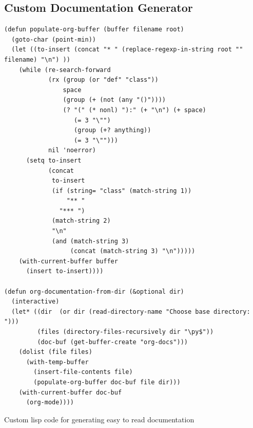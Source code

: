 \documentclass[11pt]{report}
\begin{document}
\subsection{Custom Documentation Generator}
\label{sec-7-3-2}
\begin{listing}[H]
\begin{verbatim}
(defun populate-org-buffer (buffer filename root)
  (goto-char (point-min))
  (let ((to-insert (concat "* " (replace-regexp-in-string root "" filename) "\n") ))
    (while (re-search-forward
            (rx (group (or "def" "class"))
                space
                (group (+ (not (any "()"))))
                (? "(" (* nonl) "):" (+ "\n") (+ space)
                   (= 3 "\"")
                   (group (+? anything))
                   (= 3 "\"")))
            nil 'noerror)
      (setq to-insert
            (concat
             to-insert
             (if (string= "class" (match-string 1))
                 "** "
               "*** ")
             (match-string 2)
             "\n"
             (and (match-string 3)
                  (concat (match-string 3) "\n")))))
    (with-current-buffer buffer
      (insert to-insert))))

(defun org-documentation-from-dir (&optional dir)
  (interactive)
  (let* ((dir  (or dir (read-directory-name "Choose base directory: ")))
         (files (directory-files-recursively dir "\py$"))
         (doc-buf (get-buffer-create "org-docs")))
    (dolist (file files)
      (with-temp-buffer
        (insert-file-contents file)
        (populate-org-buffer doc-buf file dir)))
    (with-current-buffer doc-buf
      (org-mode))))
\end{verbatim}
\caption{\label{lst:docgen}Custom lisp code for generating easy to read documentation}
\end{listing}

\clearpage
\end{document}
